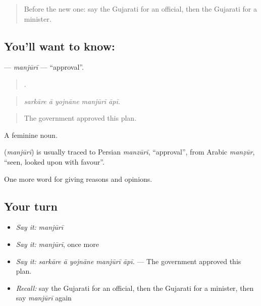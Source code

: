 \label{lesson:GU-C354-manjuri}



\begin{quote}
Before the new one: say the Gujarati for an official, then the Gujarati for a minister.
\end{quote}

\subsection*{You'll want to know: }
\textbf{} — \emph{manjūrī} — \textquotedblleft{}approval\textquotedblright{}.

\begin{quote}
    .
\end{quote}

\begin{quote}
\emph{sarkāre ā yojnāne manjūrī āpī.}
\end{quote}

\begin{quote}
The government approved this plan.
\end{quote}

A feminine noun.

\begin{cousinweb}
\textbf{} (\emph{manjūrī}) is usually traced to Persian \emph{manzūrī}, \textquotedblleft{}approval\textquotedblright{}, from Arabic \emph{manẓūr}, \textquotedblleft{}seen, looked upon with favour\textquotedblright{}.
\end{cousinweb}

\begin{grammarlens}[title={What you've built}]
One more word for giving reasons and opinions.
\end{grammarlens}

\subsection*{Your turn}
\begin{itemize}
\raggedright
  \item \emph{Say it:} \emph{manjūrī}
  \item \emph{Say it:} \emph{manjūrī}, once more
  \item \emph{Say it:} \emph{sarkāre ā yojnāne manjūrī āpī.} — The government approved this plan.
  \item \emph{Recall:} say the Gujarati for an official, then the Gujarati for a minister, then say \emph{manjūrī} again
\end{itemize}

